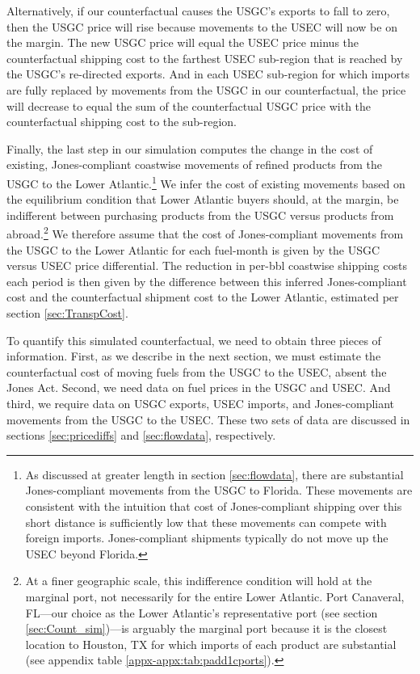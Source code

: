 \documentclass[12pt]{article}
\begin{document}
Alternatively, if our counterfactual causes the USGC's exports to fall to zero, then the USGC price will rise because movements to the USEC will now be on the margin. The new USGC price will equal the USEC price minus the counterfactual shipping cost to the farthest USEC sub-region that is reached by the USGC's re-directed exports. And in each USEC sub-region for which imports are fully replaced by movements from the USGC in our counterfactual, the price will decrease to equal the sum of the counterfactual USGC price with the counterfactual shipping cost to the sub-region.

Finally, the last step in our simulation computes the change in the cost of existing, Jones-compliant coastwise movements of refined products from the USGC to the Lower Atlantic.\footnote{As discussed at greater length in section \ref{sec:flowdata}, there are substantial Jones-compliant movements from the USGC to Florida. These movements are consistent with the intuition that cost of Jones-compliant shipping over this short distance is sufficiently low that these movements can compete with foreign imports. Jones-compliant shipments typically do not move up the USEC beyond Florida.} We infer the cost of existing movements based on the equilibrium condition that Lower Atlantic buyers should, at the margin, be indifferent between purchasing products from the USGC versus products from abroad.\footnote{At a finer geographic scale, this indifference condition will hold at the marginal port, not necessarily for the entire Lower Atlantic. Port Canaveral, FL---our choice as the Lower Atlantic's representative port (see section \ref{sec:Count_sim})---is arguably the marginal port because it is the closest location to Houston, TX for which imports of each product are substantial (see appendix table \ref{appx-appx:tab:padd1cports}).} We therefore assume that the cost of Jones-compliant movements from the USGC to the Lower Atlantic for each fuel-month is given by the USGC versus USEC price differential. The reduction in per-bbl coastwise shipping costs each period is then given by the difference between this inferred Jones-compliant cost and the counterfactual shipment cost to the Lower Atlantic, estimated per section \ref{sec:TranspCost}.

To quantify this simulated counterfactual, we need to obtain three pieces of information. First, as we describe in the next section, we must estimate the counterfactual cost of moving fuels from the USGC to the USEC, absent the Jones Act. Second, we need data on fuel prices in the USGC and USEC. And third, we require data on USGC exports, USEC imports, and Jones-compliant movements from the USGC to the USEC. These two sets of data are discussed in sections \ref{sec:pricediffs} and \ref{sec:flowdata}, respectively.
\end{document}
